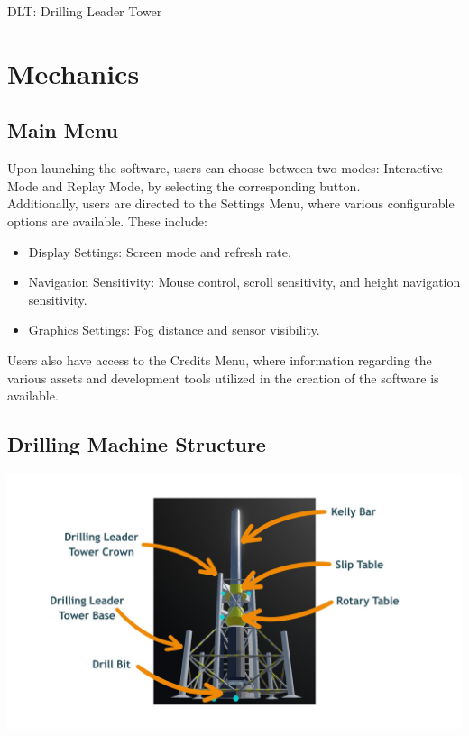 \documentclass{article}
\begin{document}
\noindent*DLT: Drilling Leader Tower



\newpage
\section{Mechanics}
\subsection{Main Menu}\hfill

Upon launching the software, users can choose between two modes: Interactive Mode and Replay Mode, by selecting the corresponding button. \\

Additionally, users are directed to the Settings Menu, where various configurable options are available. These include:
\begin{itemize}
    \item Display Settings: Screen mode and refresh rate.
    \item Navigation Sensitivity: Mouse control, scroll sensitivity, and height navigation sensitivity.
    \item Graphics Settings: Fog distance and sensor visibility.
\end{itemize}

Users also have access to the Credits Menu, where information regarding the various assets and development tools utilized in the creation of the software is available.

\subsection{Drilling Machine Structure}
\begin{center}
    \includegraphics[width=6in]{Structure.jpg}
\end{center}
\end{document}
